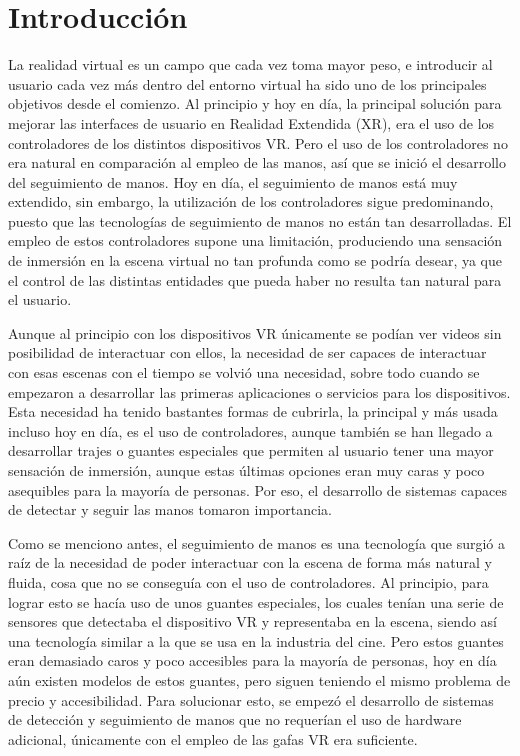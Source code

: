\documentclass[a4paper, 12pt]{book}
\begin{document}
\chapter{Introducción}
\label{sec:intro} %
La realidad virtual es un campo que cada vez toma mayor peso, e introducir al usuario cada vez más dentro del entorno virtual ha sido uno de los principales objetivos desde el comienzo. Al principio y hoy en día, la principal 
solución para mejorar las interfaces de usuario en Realidad Extendida (XR), era el uso de los controladores de los distintos dispositivos VR. Pero el uso de los controladores no era natural en comparación al empleo de las manos, así que se inició el desarrollo del seguimiento de manos. Hoy en 
día, el seguimiento de manos está muy extendido, sin embargo, la utilización de los controladores sigue predominando, puesto que las tecnologías de seguimiento de manos no están tan desarrolladas. El empleo de estos controladores supone una limitación, produciendo una sensación de inmersión en la escena virtual no tan profunda como se podría desear, ya que 
el control de las distintas entidades que pueda haber no resulta tan natural para el usuario.  

Aunque al principio con los dispositivos VR únicamente se podían ver videos sin posibilidad de interactuar con ellos, la necesidad de ser capaces de interactuar con esas escenas con el tiempo se volvió una necesidad, sobre todo cuando se empezaron a desarrollar las primeras aplicaciones o servicios para los dispositivos. 
Esta necesidad ha tenido bastantes formas de cubrirla, la principal y más usada incluso hoy en día, es el uso de controladores, aunque también se han llegado a desarrollar trajes o guantes especiales que permiten al usuario tener una mayor sensación de inmersión, aunque estas últimas opciones eran muy caras y poco asequibles para la mayoría de personas. Por eso,
el desarrollo de sistemas capaces de detectar y seguir las manos tomaron importancia.

Como se menciono antes, el seguimiento de manos es una tecnología que surgió a raíz de la necesidad de poder interactuar con la escena de forma más natural y fluida, cosa que no se conseguía con el uso de controladores. Al principio, para lograr esto se hacía uso de unos guantes especiales, los cuales tenían una serie de sensores que detectaba el dispositivo VR y representaba en la escena, siendo así una tecnología similar a la que se usa en la industria del cine.
Pero estos guantes eran demasiado caros y poco accesibles para la mayoría de personas, hoy en día aún existen modelos de estos guantes, pero siguen teniendo el mismo problema de precio y accesibilidad. Para solucionar esto, se empezó el desarrollo de sistemas de detección y seguimiento de manos que no requerían el uso de hardware adicional, únicamente con el empleo de las gafas VR era suficiente. 
\end{document}
